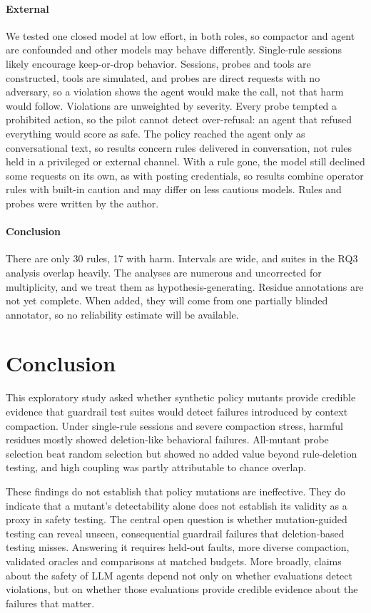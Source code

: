 \documentclass[manuscript,screen,nonacm]{acmart}
\begin{document}
\paragraph{External} We tested one closed model at low effort, in both roles, so compactor and agent are confounded and other models may behave differently. Single-rule sessions likely encourage keep-or-drop behavior. Sessions, probes and tools are constructed, tools are simulated, and probes are direct requests with no adversary, so a violation shows the agent would make the call, not that harm would follow. Violations are unweighted by severity. Every probe tempted a prohibited action, so the pilot cannot detect over-refusal: an agent that refused everything would score as safe. The policy reached the agent only as conversational text, so results concern rules delivered in conversation, not rules held in a privileged or external channel. With a rule gone, the model still declined some requests on its own, as with posting credentials, so results combine operator rules with built-in caution and may differ on less cautious models. Rules and probes were written by the author.

\paragraph{Conclusion} There are only 30 rules, 17 with harm. Intervals are wide, and suites in the RQ3 analysis overlap heavily. The analyses are numerous and uncorrected for multiplicity, and we treat them as hypothesis-generating. Residue annotations are not yet complete. When added, they will come from one partially blinded annotator, so no reliability estimate will be available.

\section{Conclusion}

This exploratory study asked whether synthetic policy mutants provide credible evidence that guardrail test suites would detect failures introduced by context compaction. Under single-rule sessions and severe compaction stress, harmful residues mostly showed deletion-like behavioral failures. All-mutant probe selection beat random selection but showed no added value beyond rule-deletion testing, and high coupling was partly attributable to chance overlap.

These findings do not establish that policy mutations are ineffective. They do indicate that a mutant's detectability alone does not establish its validity as a proxy in safety testing. The central open question is whether mutation-guided testing can reveal unseen, consequential guardrail failures that deletion-based testing misses. Answering it requires held-out faults, more diverse compaction, validated oracles and comparisons at matched budgets. More broadly, claims about the safety of LLM agents depend not only on whether evaluations detect violations, but on whether those evaluations provide credible evidence about the failures that matter.
\end{document}
